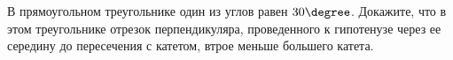 \begin{ex}
	\begin{condition}
		В прямоугольном треугольнике один из углов равен \( 30\degree\). Докажите, что в этом треугольнике отрезок перпендикуляра, проведенного к гипотенузе через ее середину до пересечения с катетом, втрое меньше большего катета.
	\end{condition}
\end{ex}